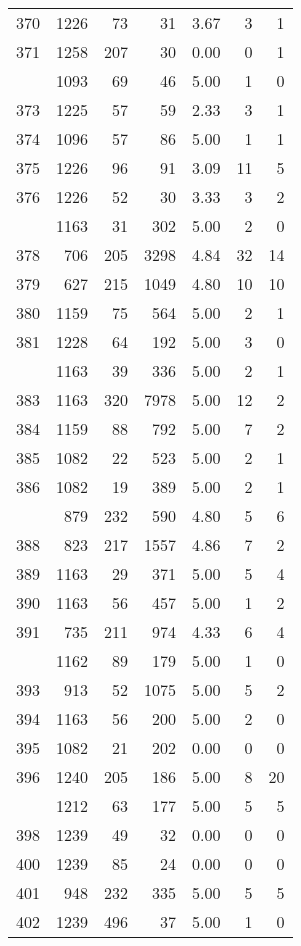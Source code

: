 \documentclass[
]{article}
\begin{document}
\begin{table}
\begin{tabular}[t]{lrrrrrr}
370 & 1226 & 73 & 31 & 3.67 & 3 & 1\\
371 & 1258 & 207 & 30 & 0.00 & 0 & 1\\
\addlinespace
372 & 1093 & 69 & 46 & 5.00 & 1 & 0\\
373 & 1225 & 57 & 59 & 2.33 & 3 & 1\\
374 & 1096 & 57 & 86 & 5.00 & 1 & 1\\
375 & 1226 & 96 & 91 & 3.09 & 11 & 5\\
376 & 1226 & 52 & 30 & 3.33 & 3 & 2\\
\addlinespace
377 & 1163 & 31 & 302 & 5.00 & 2 & 0\\
378 & 706 & 205 & 3298 & 4.84 & 32 & 14\\
379 & 627 & 215 & 1049 & 4.80 & 10 & 10\\
380 & 1159 & 75 & 564 & 5.00 & 2 & 1\\
381 & 1228 & 64 & 192 & 5.00 & 3 & 0\\
\addlinespace
382 & 1163 & 39 & 336 & 5.00 & 2 & 1\\
383 & 1163 & 320 & 7978 & 5.00 & 12 & 2\\
384 & 1159 & 88 & 792 & 5.00 & 7 & 2\\
385 & 1082 & 22 & 523 & 5.00 & 2 & 1\\
386 & 1082 & 19 & 389 & 5.00 & 2 & 1\\
\addlinespace
387 & 879 & 232 & 590 & 4.80 & 5 & 6\\
388 & 823 & 217 & 1557 & 4.86 & 7 & 2\\
389 & 1163 & 29 & 371 & 5.00 & 5 & 4\\
390 & 1163 & 56 & 457 & 5.00 & 1 & 2\\
391 & 735 & 211 & 974 & 4.33 & 6 & 4\\
\addlinespace
392 & 1162 & 89 & 179 & 5.00 & 1 & 0\\
393 & 913 & 52 & 1075 & 5.00 & 5 & 2\\
394 & 1163 & 56 & 200 & 5.00 & 2 & 0\\
395 & 1082 & 21 & 202 & 0.00 & 0 & 0\\
396 & 1240 & 205 & 186 & 5.00 & 8 & 20\\
\addlinespace
397 & 1212 & 63 & 177 & 5.00 & 5 & 5\\
398 & 1239 & 49 & 32 & 0.00 & 0 & 0\\
400 & 1239 & 85 & 24 & 0.00 & 0 & 0\\
401 & 948 & 232 & 335 & 5.00 & 5 & 5\\
402 & 1239 & 496 & 37 & 5.00 & 1 & 0\\

\end{tabular}
\end{table}
\end{document}
